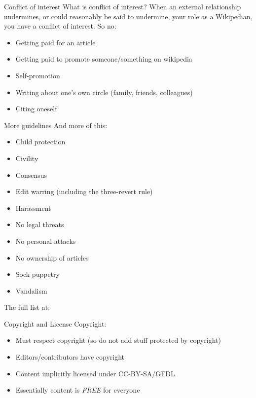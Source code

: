 \documentclass{beamer}
\begin{document}
\begin{frame}{Conflict of interest}
	What is conflict of interest?
	\pause When an external relationship undermines, or could reasonably be said to undermine, your role as a Wikipedian, you have a conflict of interest.
	\pause So no:
	\begin{itemize}
		\pause \item Getting paid for an article
		\pause \item Getting paid to promote someone/something on wikipedia
		\pause \item Self-promotion
		\pause \item Writing about one's own circle (family, friends, colleagues)
		\pause \item Citing oneself
	\end{itemize}
\end{frame}

\begin{frame}{More guidelines}
	And more of this:
	\begin{itemize}
		\item Child protection
		\item Civility
		\item Consensus
		\item Edit warring (including the three-revert rule)
		\item Harassment
		\item No legal threats
		\item No personal attacks
		\item No ownership of articles
		\item Sock puppetry
		\item Vandalism
	\end{itemize}

	The full list at:
\end{frame}

\begin{frame}{Copyright and License}
	Copyright:
		\begin{itemize}
			\pause \item Must respect copyright (so do not add stuff protected by copyright)
			\pause \item Editors/contributors have copyright
			\pause \item Content implicitly licensed under CC-BY-SA/GFDL
			\pause \item Essentially content is \emph{FREE} for everyone
		\end{itemize}
\end{frame}
\end{document}
